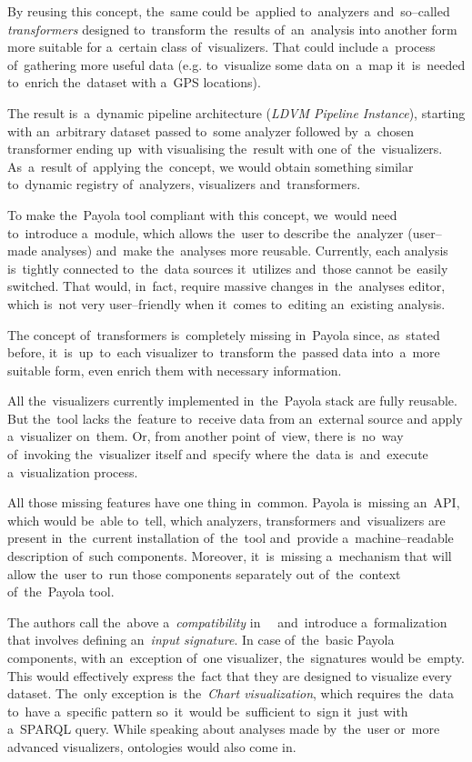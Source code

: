 By reusing this concept, the~same could be~applied to~analyzers and~so--called 
\emph{transformers} designed to~transform the~results of~an~analysis 
into another form more suitable for a~certain class of~visualizers. 
That could include a~process of~gathering more useful data (e.g. to~visualize 
some data on~a~map it~is~needed to~enrich the~dataset with a~GPS locations).

The result is~a~dynamic pipeline architecture (\emph{LDVM Pipeline Instance}),
starting with an~arbitrary 
dataset passed to~some analyzer followed by~a~chosen transformer ending up~with
visualising the~result with one of~the~visualizers. As~a~result of~applying the~concept,
we would obtain something similar to~dynamic 
registry of~analyzers, visualizers and~transformers.

To make the~Payola tool 
compliant with this concept, we~would need to~introduce a~module, which allows the~user
to describe the~analyzer (user--made analyses) and~make the~analyses more reusable. Currently, each analysis is~tightly connected to~the~data sources it~utilizes and~those cannot be~easily switched. That would, in~fact, require massive changes in~the~analyses editor, which is~not very 
user--friendly when it~comes to~editing an~existing analysis.

The concept of~transformers is~completely missing in~Payola since, as~stated 
before, it~is~up~to~each visualizer to~transform the~passed data into~a~more 
suitable form, even enrich them with necessary information.

All the~visualizers currently implemented in~the~Payola stack are fully 
reusable. But the~tool lacks the~feature to~receive data from an~external source 
and apply a~visualizer on~them. Or, from another point of~view, there is~no~way of~invoking the~visualizer itself and~specify where the~data is~and~execute a~visualization process.

All those missing features have one thing in~common. Payola is~missing 
an~API, which would be~able to~tell, which analyzers, transformers and~visualizers are present in~the~current installation of~the~tool and~provide a~machine--readable description of~such components. Moreover, it~is~missing a~mechanism that will allow the~user to~run those components separately out of~the~context of~the~Payola tool.

The authors call the~above a~\emph{compatibility} in~~\cite{ldvm2} and~introduce a~formalization that involves defining an~\emph{input signature}.
In case of~the~basic Payola components, with an~exception of~one visualizer, the~signatures
would be~empty. This would effectively express the~fact that they are designed to
visualize every dataset. The~only exception is~the~\emph{Chart visualization},
which requires the~data to~have a~specific pattern so~it~would be~sufficient to~sign it~just with a~SPARQL query. While speaking about analyses made by~the~user or~more 
advanced visualizers, ontologies would also come in.

